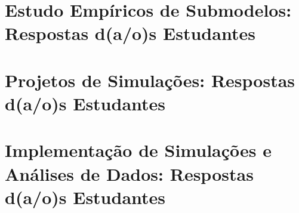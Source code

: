 \documentclass[12pt]{book}
\begin{document}
%

%    

\part{Estudo Empíricos de Submodelos: Respostas d(a/o)s Estudantes\label{part:submodelos:empiricos}}

%

\part{Projetos de Simulações: Respostas d(a/o)s Estudantes\label{part:projetos:simulacoes}}

%

\part{Implementação de Simulações e Análises de Dados: Respostas d(a/o)s Estudantes\label{part:implement:simulacoes}}

%



\end{document}
